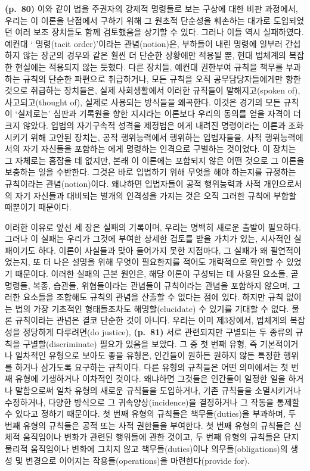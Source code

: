 \textbf{(p.~80)} 이와 같이 법을 주권자의 강제적 명령들로 보는 구상에
대한 비판 과정에서, 우리는 이 이론을 난점에서 구하기 위해 그 원초적
단순성을 훼손하는 대가로 도입되었던 여러 보조 장치들도 함께 검토했음을
상기할 수 있다. 그러나 이들 역시 실패하였다. 예컨대 ‘
명령(tacit order)’이라는 관념(notion)은, 부하들이 내린 명령에 일부러
간섭하지 않는 장군의 경우와 같은 훨씬 더 단순한 상황에만 적용될 뿐, 현대
법체계의 복잡한 현실에는 적용되지 않는 듯했다. 다른 장치들, 예컨대
권한부여 규칙을 책무를 부과하는 규칙의 단순한 파편으로 취급하거나, 모든
규칙을 오직 공무담당자들에게만 향한 것으로 취급하는 장치들은, 실제
사회생활에서 이러한 규칙들이 말해지고(spoken of), 사고되고(thought of),
실제로 사용되는 방식들을 왜곡한다. 이것은 경기의 모든 규칙이 ‘실제로는’
심판과 기록원을 향한 지시라는 이론보다 우리의 동의를 얻을 자격이 더 크지
않았다. 입법의 자기구속적 성격을 제정법은 에게 내려진
명령이라는 이론과 조화시키기 위해 고안된 장치는, 공적 행위능력에서
행위하는 입법자들을, 사적 행위능력에서의 자기 자신들을 포함하는
에게 명령하는  인격으로 구별하는 것이었다. 이
장치는 그 자체로는 흠잡을 데 없지만, 본래 이 이론에는 포함되지 않은 어떤
것으로 그 이론을 보충하는 일을 수반한다. 그것은 바로 입법하기 위해
무엇을 해야 하는지를 규정하는 규칙이라는 관념(notion)이다. 왜냐하면
입법자들이 공적 행위능력과 사적 개인으로서의 자기 자신들과 대비되는
별개의 인격성을 가지는 것은 오직 그러한 규칙에 부합할 때뿐이기 때문이다.

이러한 이유로 앞선 세 장은 실패의 기록이며, 우리는 명백히 새로운 출발이
필요하다. 그러나 이 실패는 우리가 그것에 부여한 상세한 검토를 받을
가치가 있는, 시사적인 실패이기도 하다. 이론이 사실들과 맞아 들어가지
못한 지점마다, 그 실패가 왜 필연적이었는지, 또 더 나은 설명을 위해
무엇이 필요한지를 적어도 개략적으로 확인할 수 있었기 때문이다. 이러한
실패의 근본 원인은, 해당 이론이 구성되는 데 사용된 요소들, 곧 명령들,
복종, 습관들, 위협들이라는 관념들이 규칙이라는 관념을 포함하지 않으며,
그러한 요소들을 조합해도 규칙의 관념을 산출할 수 없다는 점에 있다.
하지만 규칙 없이는 법의 가장 기초적인 형태들조차도 해명할(elucidate) 수
있기를 기대할 수 없다. 물론 규칙이라는 관념은 결코 단순한 것이 아니다.
우리는 이미 제3장에서, 법체계의 복잡성을 정당하게 다루려면(do justice),
\textbf{(p.~81)} 서로 관련되지만 구별되는 두 종류의 규칙을
구별할(discriminate) 필요가 있음을 보았다. 그 중 첫 번째 유형, 즉
기본적이거나 일차적인 유형으로 보아도 좋을 유형은, 인간들이 원하든
원하지 않든 특정한 행위를 하거나 삼가도록 요구하는 규칙이다. 다른 유형의
규칙들은 어떤 의미에서는 첫 번째 유형에 기생하거나 이차적인 것이다.
왜냐하면 그것들은 인간들이 일정한 일을 하거나 말함으로써 일차 유형의
새로운 규칙들을 도입하거나, 기존 규칙들을 소멸시키거나 수정하거나,
다양한 방식으로 그 귀속양상(incidence)을 결정하거나 그 작동을 통제할 수
있다고 정하기 때문이다. 첫 번째 유형의 규칙들은 책무들(duties)을
부과하며, 두 번째 유형의 규칙들은 공적 또는 사적 권한들을 부여한다. 첫
번째 유형의 규칙들은 신체적 움직임이나 변화가 관련된 행위들에 관한
것이고, 두 번째 유형의 규칙들은 단지 물리적 움직임이나 변화에 그치지
않고 책무들(duties)이나 의무들(obligations)의 생성 및 변경으로 이어지는
작용들(operations)을 마련한다(provide for).

